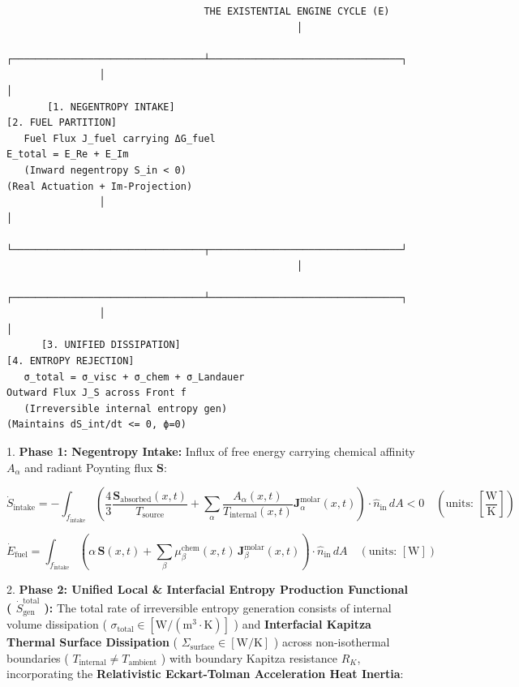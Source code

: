 \documentclass[11pt,a4paper]{article}
\theoremstyle{definition}
\theoremstyle{remark}
\begin{document}
\begin{verbatim}
                                  THE EXISTENTIAL ENGINE CYCLE (E)
                                                  │
                ┌─────────────────────────────────┴─────────────────────────────────┐
                │                                                                   │
       [1. NEGENTROPY INTAKE]                                              [2. FUEL PARTITION]
   Fuel Flux J_fuel carrying ΔG_fuel                                      E_total = E_Re + E_Im
   (Inward negentropy S_in < 0)                                           (Real Actuation + Im-Projection)
                │                                                                   │
                └─────────────────────────────────┬─────────────────────────────────┘
                                                  │
                ┌─────────────────────────────────┴─────────────────────────────────┐
                │                                                                   │
      [3. UNIFIED DISSIPATION]                                            [4. ENTROPY REJECTION]
   σ_total = σ_visc + σ_chem + σ_Landauer                                 Outward Flux J_S across Front f
   (Irreversible internal entropy gen)                                    (Maintains dS_int/dt <= 0, ϕ=0)
\end{verbatim}

1. \textbf{Phase 1: Negentropy Intake:} Influx of free energy carrying chemical affinity $A_\alpha$ and radiant Poynting flux $\mathbf{S}$:


\begin{equation}
\boxed{\dot{S}_{\text{intake}} = -\int_{f_{\text{intake}}} \left( \frac{4}{3} \frac{\mathbf{S}_{\text{absorbed}}(x, t)}{T_{\text{source}}} + \sum_\alpha \frac{A_\alpha(x, t)}{T_{\text{internal}}(x, t)} \mathbf{J}_{\alpha}^{\text{molar}}(x, t) \right) \cdot \hat{n}_{\text{in}} \, dA < 0 \quad \left( \text{units: } [\frac{\mathrm{W}}{\mathrm{K}}] \right)}
\end{equation}



\begin{equation}
\boxed{\dot{E}_{\text{fuel}} = \int_{f_{\text{intake}}} \left( \alpha \, \mathbf{S}(x, t) + \sum_\beta \mu_\beta^{\text{chem}}(x, t) \, \mathbf{J}_\beta^{\text{molar}}(x, t) \right) \cdot \hat{n}_{\text{in}} \, dA \quad \left( \text{units: } [\mathrm{W}] \right)}
\end{equation}


2. \textbf{Phase 2: Unified Local \& Interfacial Entropy Production Functional ( $\dot{S}_{\text{gen}}^{\text{total}}$ ):}
The total rate of irreversible entropy generation consists of internal volume dissipation ( $\sigma_{\text{total}} \in [\mathrm{W/(m^3\cdot K)}]$ ) and \textbf{Interfacial Kapitza Thermal Surface Dissipation} ( $\Sigma_{\text{surface}} \in [\mathrm{W/K}]$ ) across non-isothermal boundaries ( $T_{\text{internal}} \neq T_{\text{ambient}}$ ) with boundary Kapitza resistance $R_K$, incorporating the \textbf{Relativistic Eckart-Tolman Acceleration Heat Inertia}:
\end{document}
